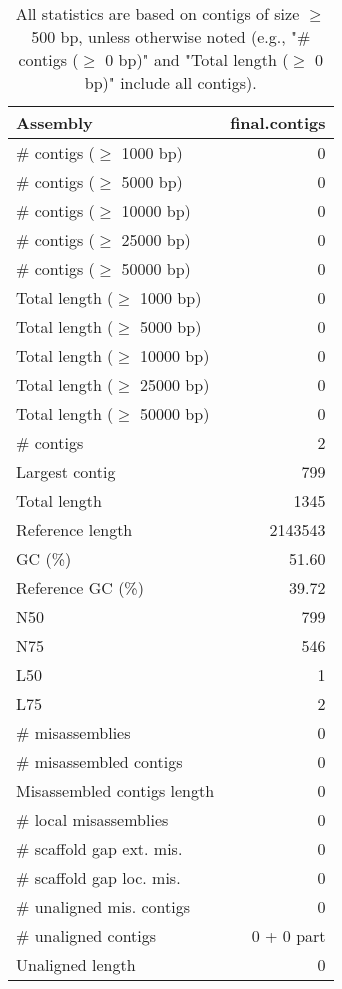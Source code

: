 \documentclass[12pt,a4paper]{article}
\begin{document}
\begin{table}[ht]
\begin{center}
\caption{All statistics are based on contigs of size $\geq$ 500 bp, unless otherwise noted (e.g., "\# contigs ($\geq$ 0 bp)" and "Total length ($\geq$ 0 bp)" include all contigs).}
\begin{tabular}{|l*{1}{|r}|}
\hline
Assembly & final.contigs \\ \hline
\# contigs ($\geq$ 1000 bp) & 0 \\ \hline
\# contigs ($\geq$ 5000 bp) & 0 \\ \hline
\# contigs ($\geq$ 10000 bp) & 0 \\ \hline
\# contigs ($\geq$ 25000 bp) & 0 \\ \hline
\# contigs ($\geq$ 50000 bp) & 0 \\ \hline
Total length ($\geq$ 1000 bp) & 0 \\ \hline
Total length ($\geq$ 5000 bp) & 0 \\ \hline
Total length ($\geq$ 10000 bp) & 0 \\ \hline
Total length ($\geq$ 25000 bp) & 0 \\ \hline
Total length ($\geq$ 50000 bp) & 0 \\ \hline
\# contigs & 2 \\ \hline
Largest contig & 799 \\ \hline
Total length & 1345 \\ \hline
Reference length & 2143543 \\ \hline
GC (\%) & 51.60 \\ \hline
Reference GC (\%) & 39.72 \\ \hline
N50 & 799 \\ \hline
N75 & 546 \\ \hline
L50 & 1 \\ \hline
L75 & 2 \\ \hline
\# misassemblies & 0 \\ \hline
\# misassembled contigs & 0 \\ \hline
Misassembled contigs length & 0 \\ \hline
\# local misassemblies & 0 \\ \hline
\# scaffold gap ext. mis. & 0 \\ \hline
\# scaffold gap loc. mis. & 0 \\ \hline
\# unaligned mis. contigs & 0 \\ \hline
\# unaligned contigs & 0 + 0 part \\ \hline
Unaligned length & 0 \\ \hline

\end{tabular}
\end{center}
\end{table}
\end{document}

